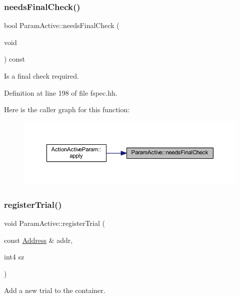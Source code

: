 \subsubsection{\texorpdfstring{needsFinalCheck()}{needsFinalCheck()}}
{\footnotesize\ttfamily bool Param\+Active\+::needs\+Final\+Check (\begin{DoxyParamCaption}\item[{void}]{ }\end{DoxyParamCaption}) const\hspace{0.3cm}{\ttfamily [inline]}}



Is a final check required. 



Definition at line 198 of file fspec.\+hh.

Here is the caller graph for this function\+:
\nopagebreak
\begin{figure}[H]
\begin{center}
\leavevmode
\includegraphics[width=350pt]{class_param_active_a3b308bb5dafd2bafc5e425991deab476_icgraph}
\end{center}
\end{figure}
\mbox{\label{class_param_active_a43a357162f55b3b8f7e13a013ad207b5}} 
\subsubsection{\texorpdfstring{registerTrial()}{registerTrial()}}
{\footnotesize\ttfamily void Param\+Active\+::register\+Trial (\begin{DoxyParamCaption}\item[{const \mbox{\hyperlink{class_address}{Address}} \&}]{addr,  }\item[{int4}]{sz }\end{DoxyParamCaption})}



Add a new trial to the container. 

